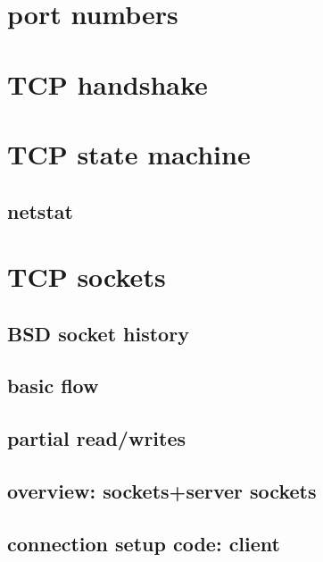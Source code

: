 
\section{port numbers}


\section{TCP handshake}



\section{TCP state machine}


\subsection{netstat}


\section{TCP sockets}

\subsection{BSD socket history}


\subsection{basic flow}


\subsection{partial read/writes}



\subsection{overview: sockets+server sockets}
  

\subsection{connection setup code: client}
 

